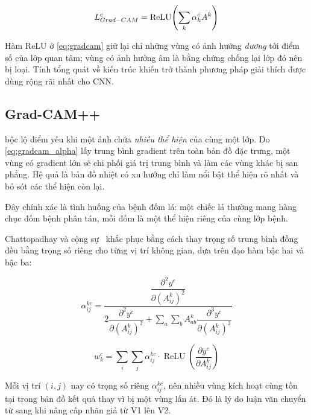 \begin{equation}
    L^{c}_{Grad-CAM} = \operatorname{ReLU}\!\left(\sum_{k} \alpha^{c}_{k} A^{k}\right)
    \label{eq:gradcam}
\end{equation}

Hàm ReLU ở \cref{eq:gradcam} giữ lại chỉ những vùng có ảnh hưởng \emph{dương} tới
điểm số của lớp quan tâm; vùng có ảnh hưởng âm là bằng chứng chống lại lớp đó nên
bị loại. Tính tổng quát về kiến trúc khiến \GradCAM{} trở thành phương pháp giải
thích được dùng rộng rãi nhất cho CNN.

\subsection{Grad-CAM++}

\GradCAM{} bộc lộ điểm yếu khi một ảnh chứa \emph{nhiều thể hiện} của cùng một
lớp. Do \cref{eq:gradcam_alpha} lấy trung bình gradient trên toàn bản đồ đặc
trưng, một vùng có gradient lớn sẽ chi phối giá trị trung bình và làm các vùng
khác bị san phẳng. Hệ quả là bản đồ nhiệt có xu hướng chỉ làm nổi bật thể hiện rõ
nhất và bỏ sót các thể hiện còn lại.

Đây chính xác là tình huống của bệnh đốm lá: một chiếc lá thường mang hàng chục
đốm bệnh phân tán, mỗi đốm là một thể hiện riêng của cùng lớp bệnh.

Chattopadhay và cộng sự~\cite{chattopadhay2018gradcampp} khắc phục bằng cách thay
trọng số trung bình đồng đều bằng trọng số riêng cho từng vị trí không gian, dựa
trên đạo hàm bậc hai và bậc ba:

\begin{equation}
    \alpha^{kc}_{ij} = \frac{\dfrac{\partial^{2} y^{c}}{\partial (A^{k}_{ij})^{2}}}
    {2\dfrac{\partial^{2} y^{c}}{\partial (A^{k}_{ij})^{2}}
     + \displaystyle\sum_{a}\sum_{b} A^{k}_{ab} \dfrac{\partial^{3} y^{c}}{\partial (A^{k}_{ij})^{3}}}
    \label{eq:gradcampp_alpha}
\end{equation}

\begin{equation}
    w^{c}_{k} = \sum_{i}\sum_{j} \alpha^{kc}_{ij} \cdot
                \operatorname{ReLU}\!\left(\frac{\partial y^{c}}{\partial A^{k}_{ij}}\right)
    \label{eq:gradcampp_w}
\end{equation}

Mỗi vị trí $(i,j)$ nay có trọng số riêng $\alpha^{kc}_{ij}$, nên nhiều vùng kích
hoạt cùng tồn tại trong bản đồ kết quả thay vì bị một vùng lấn át. Đó là lý do
luận văn chuyển từ \GradCAM{} sang \GradCAMpp{} khi nâng cấp nhãn giả từ V1 lên
V2.

